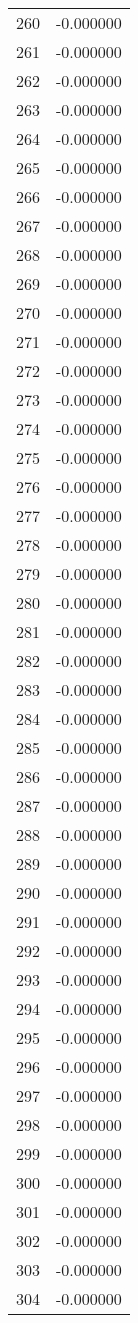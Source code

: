 \documentclass[12pt]{article}
\begin{document}
\begin{longtable}{@{}cc@{}}
260 & -0.000000 \\
261 & -0.000000 \\
262 & -0.000000 \\
263 & -0.000000 \\
264 & -0.000000 \\
265 & -0.000000 \\
266 & -0.000000 \\
267 & -0.000000 \\
268 & -0.000000 \\
269 & -0.000000 \\
270 & -0.000000 \\
271 & -0.000000 \\
272 & -0.000000 \\
273 & -0.000000 \\
274 & -0.000000 \\
275 & -0.000000 \\
276 & -0.000000 \\
277 & -0.000000 \\
278 & -0.000000 \\
279 & -0.000000 \\
280 & -0.000000 \\
281 & -0.000000 \\
282 & -0.000000 \\
283 & -0.000000 \\
284 & -0.000000 \\
285 & -0.000000 \\
286 & -0.000000 \\
287 & -0.000000 \\
288 & -0.000000 \\
289 & -0.000000 \\
290 & -0.000000 \\
291 & -0.000000 \\
292 & -0.000000 \\
293 & -0.000000 \\
294 & -0.000000 \\
295 & -0.000000 \\
296 & -0.000000 \\
297 & -0.000000 \\
298 & -0.000000 \\
299 & -0.000000 \\
300 & -0.000000 \\
301 & -0.000000 \\
302 & -0.000000 \\
303 & -0.000000 \\
304 & -0.000000 \\

\end{longtable}
\end{document}
